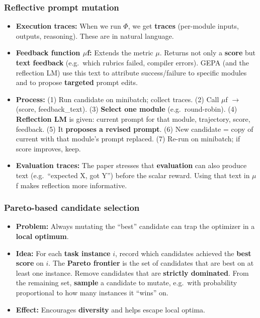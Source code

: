 \documentclass[11pt,a4paper]{article}
\begin{document}
\subsubsection{Reflective prompt mutation}

\begin{itemize}
  \item \textbf{Execution traces:} When we run $\Phi$, we get \textbf{traces} (per-module inputs, outputs, reasoning). These are in natural language.
  \item \textbf{Feedback function $\mu$f:} Extends the metric $\mu$. Returns not only a \textbf{score} but \textbf{text feedback} (e.g.\ which rubrics failed, compiler errors). GEPA (and the reflection LM) use this text to attribute success/failure to specific modules and to propose \textbf{targeted} prompt edits.
  \item \textbf{Process:} (1) Run candidate on minibatch; collect traces. (2) Call $\mu$f $\to$ (score, feedback\_text). (3) \textbf{Select one module} (e.g.\ round-robin). (4) \textbf{Reflection LM} is given: current prompt for that module, trajectory, score, feedback. (5) It \textbf{proposes a revised prompt}. (6) New candidate = copy of current with that module's prompt replaced. (7) Re-run on minibatch; if score improves, keep.
  \item \textbf{Evaluation traces:} The paper stresses that \textbf{evaluation} can also produce text (e.g.\ ``expected X, got Y'') before the scalar reward. Using that text in $\mu$f makes reflection more informative.
\end{itemize}

\subsubsection{Pareto-based candidate selection}

\begin{itemize}
  \item \textbf{Problem:} Always mutating the ``best'' candidate can trap the optimizer in a \textbf{local optimum}.
  \item \textbf{Idea:} For each \textbf{task instance} $i$, record which candidates achieved the \textbf{best score} on $i$. The \textbf{Pareto frontier} is the set of candidates that are best on at least one instance. Remove candidates that are \textbf{strictly dominated}. From the remaining set, \textbf{sample} a candidate to mutate, e.g.\ with probability proportional to how many instances it ``wins'' on.
  \item \textbf{Effect:} Encourages \textbf{diversity} and helps escape local optima.
\end{itemize}
\end{document}
